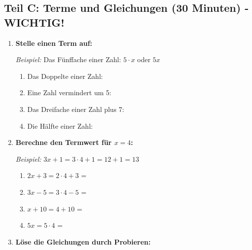 \subsection*{Teil C: Terme und Gleichungen (30 Minuten) - \textbf{WICHTIG!}}

\begin{enumerate}[resume, label=\arabic*.]
    \item \textbf{Stelle einen Term auf:}

    \textit{Beispiel:} Das Fünffache einer Zahl: $5 \cdot x$ oder $5x$

    \begin{enumerate}[label=\alph*)]
        \item Das Doppelte einer Zahl: \underline{\hspace{4cm}}
        \item Eine Zahl vermindert um 5: \underline{\hspace{4cm}}
        \item Das Dreifache einer Zahl plus 7: \underline{\hspace{4cm}}
        \item Die Hälfte einer Zahl: \underline{\hspace{4cm}}
    \end{enumerate}

    \vspace{0.5cm}

    \item \textbf{Berechne den Termwert für $x = 4$:}

    \textit{Beispiel:} $3x + 1 = 3 \cdot 4 + 1 = 12 + 1 = 13$

    \begin{enumerate}[label=\alph*)]
        \item $2x + 3 = 2 \cdot 4 + 3$ = \underline{\hspace{3cm}}
        \item $3x - 5 = 3 \cdot 4 - 5$ = \underline{\hspace{3cm}}
        \item $x + 10 = 4 + 10$ = \underline{\hspace{3cm}}
        \item $5x = 5 \cdot 4$ = \underline{\hspace{3cm}}
    \end{enumerate}

    \vspace{0.5cm}

    \item \textbf{Löse die Gleichungen durch Probieren:}


\end{enumerate}
